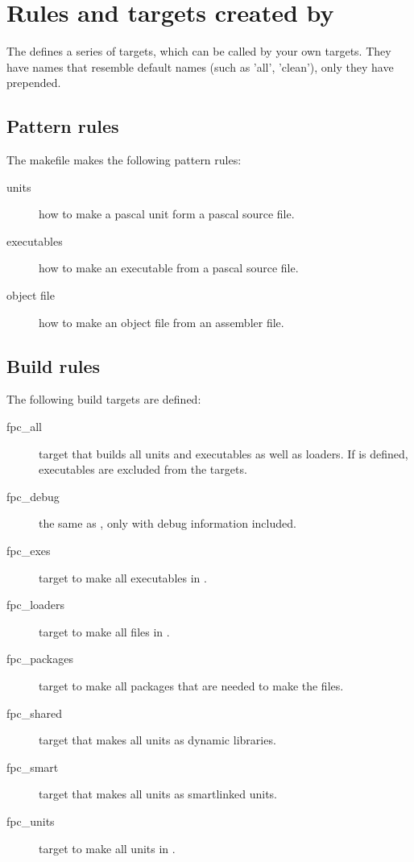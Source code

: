 {\section{Rules and targets created by \fpcmake{}}

The  defines a series of targets, which can be called by
your own targets. They have names that resemble default names (such as
'all', 'clean'), only they have  prepended.

\subsection{Pattern rules}

The makefile makes the following pattern rules:
\begin{description}
\item[units] how to make a pascal unit form a pascal source file.
\item[executables] how to make an executable from a pascal source file.
\item[object file] how to make an object file from an assembler file.
\end{description}

\subsection{Build rules}

The following build targets are defined:
\begin{description}
\item[fpc\_all] target that builds all units and executables as well as
loaders. If  is defined, executables are excluded from the
targets.
\item[fpc\_debug] the same as , only with debug information
included.
\item[fpc\_exes] target to make all executables in .
\item[fpc\_loaders] target to make all files in .
\item[fpc\_packages] target to make all packages that are needed to make
the files.
\item[fpc\_shared] target that makes all units as dynamic libraries.
\item[fpc\_smart] target that makes all units as smartlinked units.
\item[fpc\_units] target to make all units in .
\end{description}

}
